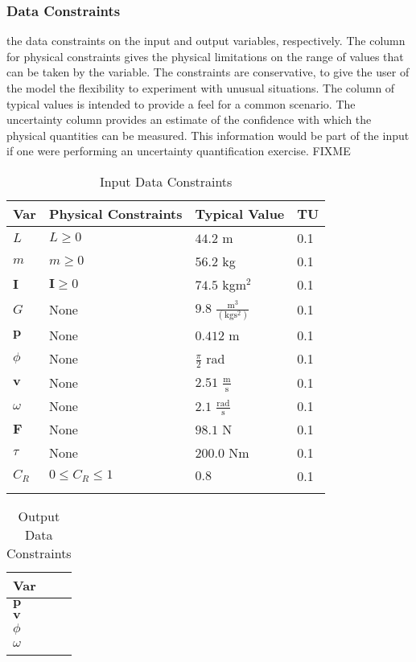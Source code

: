 \documentclass[12pt]{article}
\begin{document}
\subsubsection{Data Constraints}
\label{Sec:DataConstraints}
the data constraints on the input and output variables, respectively. The column for physical constraints gives the physical limitations on the range of values that can be taken by the variable. The constraints are conservative, to give the user of the model the flexibility to experiment with unusual situations. The column of typical values is intended to provide a feel for a common scenario. The uncertainty column provides an estimate of the confidence with which the physical quantities can be measured. This information would be part of the input if one were performing an uncertainty quantification exercise. FIXME
\begin{longtable}{l l l l}
\toprule
Var & Physical Constraints & Typical Value & TU
\\
\midrule
$L$ & $L\geq{}0$ & $44.2$ m & 0.1
\\
$m$ & $m\geq{}0$ & $56.2$ kg & 0.1
\\
$\mathbf{I}$ & $\mathbf{I}\geq{}0$ & $74.5$ kg$\text{m}^{2}$ & 0.1
\\
$G$ & None & $9.8$ $\frac{\text{m}^{3}}{(\text{kg}\text{s}^{2})}$ & 0.1
\\
$\mathbf{p}$ & None & $0.412$ m & 0.1
\\
$\phi{}$ & None & $\frac{\pi{}}{2}$ rad & 0.1
\\
$\mathbf{v}$ & None & $2.51$ $\frac{\text{m}}{\text{s}}$ & 0.1
\\
$\omega{}$ & None & $2.1$ $\frac{\text{rad}}{\text{s}}$ & 0.1
\\
$\mathbf{F}$ & None & $98.1$ N & 0.1
\\
$\tau{}$ & None & $200.0$ Nm & 0.1
\\
${C_{R}}$ & $0\leq{}{C_{R}}\leq{}1$ & $0.8$ & 0.1
\\
\bottomrule
\caption{Input Data Constraints}
\label{Table:InDataConstraints}
\end{longtable}
\begin{longtable}{l}
\toprule
Var
\\
\midrule
$\mathbf{p}$
\\
$\mathbf{v}$
\\
$\phi{}$
\\
$\omega{}$
\\
\bottomrule
\caption{Output Data Constraints}
\label{Table:OutDataConstraints}
\end{longtable}
\end{document}
